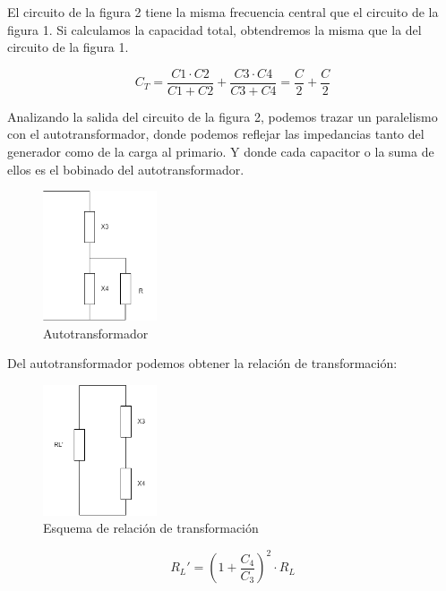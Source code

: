 El circuito de la figura 2 tiene la misma frecuencia central que el circuito de la figura 1. Si calculamos la capacidad total, obtendremos la misma que la del circuito de la figura 1.

\begin{equation}
    C_T = \frac{C1 \cdot C2}{C1 + C2} + \frac{C3 \cdot C4}{C3 + C4} = \frac{C}{2} + \frac{C}{2} 
\end{equation}

Analizando la salida del circuito de la figura 2, podemos trazar un paralelismo con el autotransformador, donde podemos reflejar las impedancias tanto del 
generador como de la carga al primario. Y donde cada capacitor o la suma de ellos es el bobinado del autotransformador.

\begin{figure}[h]
    \centering
    \includegraphics[width=0.3\textwidth]{Imagenes/Esquema_autotrafo.png}
    \caption{Autotransformador}
\end{figure}

Del autotransformador podemos obtener la relación de transformación:

\begin{figure}[h]
    \centering
    \includegraphics[width=0.3\textwidth]{Imagenes/relacion_transformacion.png}
    \caption{Esquema de relación de transformación}
\end{figure}

\begin{equation}
    R_L' = (1 + \frac{C_4}{C_3})^2 \cdot R_L 
\end{equation}


